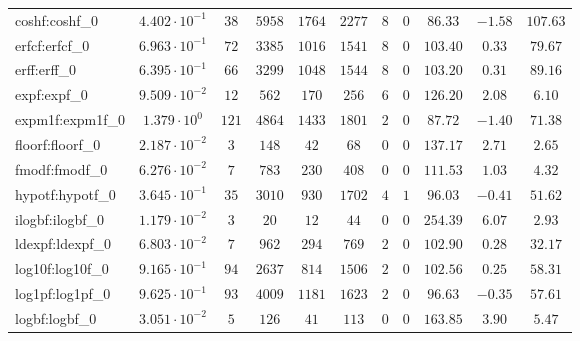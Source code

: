 \begin{tabular}{|l|c|c|c|c|c|c|c|c|c|c|}
coshf:coshf\_0               & $ 4.402 \cdot 10^{-1} $ & $ 38     $ & $ 5958  $ & $ 1764  $ & $ 2277  $ & $ 8   $ & $ 0 $ & $ 86.33       $ & $ -1.58   $ & $ 107.63  $ \\
erfcf:erfcf\_0               & $ 6.963 \cdot 10^{-1} $ & $ 72     $ & $ 3385  $ & $ 1016  $ & $ 1541  $ & $ 8   $ & $ 0 $ & $ 103.40      $ & $ 0.33    $ & $ 79.67   $ \\
erff:erff\_0                 & $ 6.395 \cdot 10^{-1} $ & $ 66     $ & $ 3299  $ & $ 1048  $ & $ 1544  $ & $ 8   $ & $ 0 $ & $ 103.20      $ & $ 0.31    $ & $ 89.16   $ \\
expf:expf\_0                 & $ 9.509 \cdot 10^{-2} $ & $ 12     $ & $ 562   $ & $ 170   $ & $ 256   $ & $ 6   $ & $ 0 $ & $ 126.20      $ & $ 2.08    $ & $ 6.10    $ \\
expm1f:expm1f\_0             & $ 1.379 \cdot 10^{0}  $ & $ 121    $ & $ 4864  $ & $ 1433  $ & $ 1801  $ & $ 2   $ & $ 0 $ & $ 87.72       $ & $ -1.40   $ & $ 71.38   $ \\
floorf:floorf\_0             & $ 2.187 \cdot 10^{-2} $ & $ 3      $ & $ 148   $ & $ 42    $ & $ 68    $ & $ 0   $ & $ 0 $ & $ 137.17      $ & $ 2.71    $ & $ 2.65    $ \\
fmodf:fmodf\_0               & $ 6.276 \cdot 10^{-2} $ & $ 7      $ & $ 783   $ & $ 230   $ & $ 408   $ & $ 0   $ & $ 0 $ & $ 111.53      $ & $ 1.03    $ & $ 4.32    $ \\
hypotf:hypotf\_0             & $ 3.645 \cdot 10^{-1} $ & $ 35     $ & $ 3010  $ & $ 930   $ & $ 1702  $ & $ 4   $ & $ 1 $ & $ 96.03       $ & $ -0.41   $ & $ 51.62   $ \\
ilogbf:ilogbf\_0             & $ 1.179 \cdot 10^{-2} $ & $ 3      $ & $ 20    $ & $ 12    $ & $ 44    $ & $ 0   $ & $ 0 $ & $ 254.39      $ & $ 6.07    $ & $ 2.93    $ \\
ldexpf:ldexpf\_0             & $ 6.803 \cdot 10^{-2} $ & $ 7      $ & $ 962   $ & $ 294   $ & $ 769   $ & $ 2   $ & $ 0 $ & $ 102.90      $ & $ 0.28    $ & $ 32.17   $ \\
log10f:log10f\_0             & $ 9.165 \cdot 10^{-1} $ & $ 94     $ & $ 2637  $ & $ 814   $ & $ 1506  $ & $ 2   $ & $ 0 $ & $ 102.56      $ & $ 0.25    $ & $ 58.31   $ \\
log1pf:log1pf\_0             & $ 9.625 \cdot 10^{-1} $ & $ 93     $ & $ 4009  $ & $ 1181  $ & $ 1623  $ & $ 2   $ & $ 0 $ & $ 96.63       $ & $ -0.35   $ & $ 57.61   $ \\
logbf:logbf\_0               & $ 3.051 \cdot 10^{-2} $ & $ 5      $ & $ 126   $ & $ 41    $ & $ 113   $ & $ 0   $ & $ 0 $ & $ 163.85      $ & $ 3.90    $ & $ 5.47    $ \\

\end{tabular}
